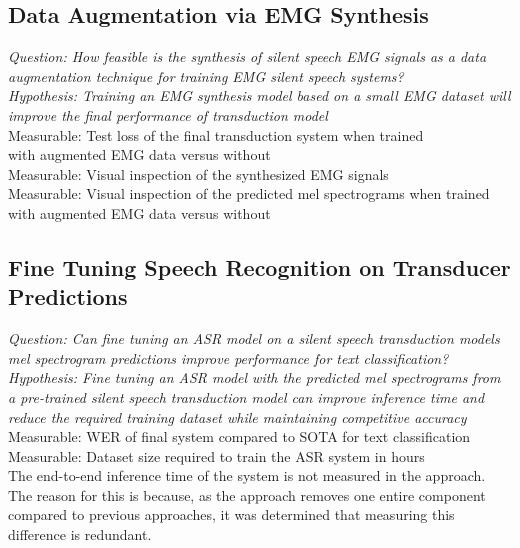 \subsection{Data Augmentation via EMG Synthesis}

\textit{Question: How feasible is the synthesis of silent speech EMG signals
as a data augmentation technique for training EMG silent speech systems?} \\
\textit{Hypothesis: Training an EMG synthesis model based on a small
EMG dataset will improve the final performance of transduction model} \\

Measurable: Test loss of the final transduction system when trained\\
with augmented EMG data versus without\\
Measurable: Visual inspection of the synthesized EMG signals\\
Measurable: Visual inspection of the predicted mel spectrograms when
trained with augmented EMG data versus without\\

\subsection{Fine Tuning Speech Recognition on Transducer Predictions }


\textit{Question: Can fine tuning an ASR model on a silent speech
transduction models mel spectrogram predictions improve performance for
text classification?} \\
\textit{Hypothesis: Fine tuning an ASR model with the predicted
mel spectrograms from a pre-trained silent speech transduction model
can improve inference time and reduce the required training dataset
while maintaining competitive accuracy} \\

Measurable: WER of final system compared to SOTA for text classification \\
Measurable: Dataset size required to train the ASR system in hours \\

The end-to-end inference time of the system is not measured in the
approach. The reason for this is because, as the approach removes one
entire component compared to previous approaches, it was determined that
measuring this difference is redundant.